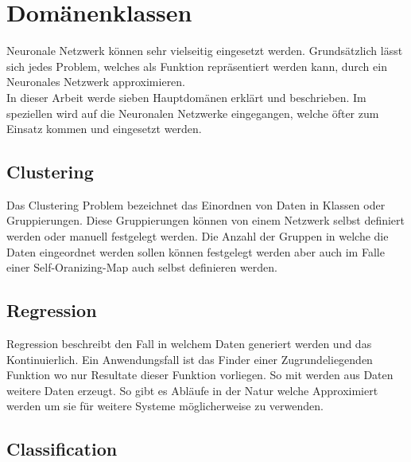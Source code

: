 \section{Domänenklassen}
\label{sec:Domänenklassen}

Neuronale Netzwerk können sehr vielseitig eingesetzt werden. 
Grundsätzlich lässt sich jedes Problem, welches als Funktion repräsentiert werden kann, durch ein Neuronales Netzwerk approximieren. \\

\noindent
In dieser Arbeit werde sieben Hauptdomänen erklärt und beschrieben. %
Im speziellen wird auf die Neuronalen Netzwerke eingegangen, welche öfter zum Einsatz kommen und eingesetzt werden.

\subsection{Clustering}
\label{subsec:Clustering}

Das Clustering Problem bezeichnet das Einordnen von Daten in Klassen oder Gruppierungen. 
Diese Gruppierungen können von einem Netzwerk selbst definiert werden oder manuell festgelegt werden. 
Die Anzahl der Gruppen in welche die Daten eingeordnet werden sollen können festgelegt werden aber auch im Falle einer Self-Oranizing-Map auch selbst definieren werden.

\subsection{Regression}
\label{subsec:Regression}

Regression beschreibt den Fall in welchem Daten generiert werden und das Kontinuierlich.
Ein Anwendungsfall ist das Finder einer Zugrundeliegenden Funktion wo nur Resultate dieser Funktion vorliegen. 
So mit werden aus Daten weitere Daten erzeugt.
So gibt es Abläufe in der Natur welche Approximiert werden um sie für weitere Systeme möglicherweise zu verwenden. \cite{bishop2006pattern}

\subsection{Classification}
\label{subsec:Classification}

